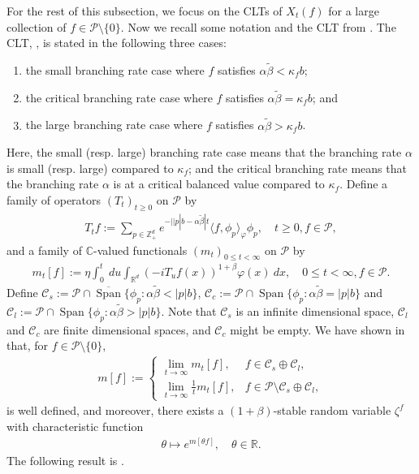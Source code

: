 \documentclass[12pt,a4paper]{amsart}
\theoremstyle{plain}
\theoremstyle{definition}
\numberwithin{equation}{section}
\begin{document}
For the rest of this subsection, we focus on the CLTs of $X_t(f)$ for a large collection of $f\in \mathcal P\setminus \{0\}$.
Now we recall some notation and the CLT from \cite{RenSongSunZhao2019Stable}.
The CLT,  \cite[Theorem 1.6]{RenSongSunZhao2019Stable}, is stated  in the following three cases:
\begin{enumerate}
\item
  the small branching rate case where
$f$ satisfies $\alpha \tilde \beta < \kappa_f b$;
\item
  the critical branching rate case where
$f$ satisfies $\alpha \tilde \beta = \kappa_f b$; and
\item
  the large branching rate case  where
$f$ satisfies $\alpha \tilde \beta > \kappa_f b$.
\end{enumerate}
Here, the small (resp. large) branching rate case means that the branching rate $\alpha$ is small (resp. large) compared to $\kappa_f$;
 and the critical branching rate means that the branching rate $\alpha$ is at a critical balanced value compared to $\kappa_f$.
Define a family of operators $(T_t)_{t\geq 0}$ on $\mathcal P$ by
\begin{align}
  \label{eq:I:R:1}
  T_t f
  := \sum_{p \in \mathbb Z_+^d} e^{-| |p|b - \alpha \tilde \beta |t} \langle f, \phi_p \rangle_{\varphi} \phi_p
  ,\quad t\geq 0, f\in \mathcal P,
\end{align}
and a family of $\mathbb C$-valued functionals $(m_t)_{0 \leq t < \infty}$ on $\mathcal P$ by
\begin{align}
  \label{eq:I:R:2}
  m_t[f]
  := \eta \int_0^t ~du \int_{\mathbb R^d} (-iT_u f(x))^{1+\beta} \varphi(x) ~dx
  , \quad 0 \leq t< \infty, f\in \mathcal P.
\end{align}
Define $ \mathcal C_s := \mathcal P \cap \overline{\operatorname{Span}} \{ \phi_p: \alpha \tilde \beta < |p| b \}$, $\mathcal C_c   := \mathcal P \cap \operatorname{Span} \{ \phi_p : \alpha \tilde \beta = |p| b \} $
and $ \mathcal C_l   := \mathcal P \cap \operatorname{Span} \{ \phi_p: \alpha \tilde \beta > |p| b \}$.
Note that $\mathcal C_s$ is an infinite dimensional space, $ \mathcal C_l$ and $\mathcal C_c$
are finite dimensional spaces, and $\mathcal C_c$ might be empty.
We have shown in \cite[Lemma 2.6 and Propsoition 2.7]{RenSongSunZhao2019Stable} that,
for $f\in \mathcal P\setminus \{0\}$,
\begin{align}
  \label{eq:I:R:3}
  m[f]
  := \begin{cases}
    \lim_{t\to \infty} m_t[f], &
    f \in \mathcal C_s \oplus \mathcal C_l, \\
    \lim_{t\to \infty} \frac{1}{t} m_t[f], & f\in \mathcal P \setminus \mathcal C_s \oplus \mathcal C_l,
  \end{cases}
\end{align}
is well defined, and moreover, there exists a $(1+\beta)$-stable random variable $\zeta^f$ with characteristic function
\begin{align}\label{eq: charac func11}
 \theta \mapsto e^{m[\theta f]}, \quad \theta \in \mathbb R.
\end{align}
The following result is \cite[Theorem 1.6]{RenSongSunZhao2019Stable}.
\end{document}
